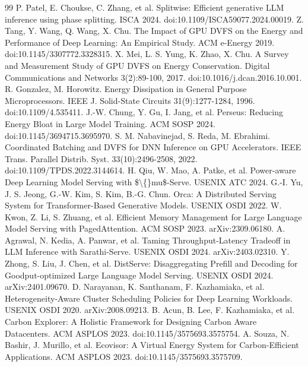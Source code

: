 \begin{thebibliography}{99}
\label{r16} P. Patel, E. Choukse, C. Zhang, et al. Splitwise: Efficient generative LLM inference using phase splitting. ISCA 2024. doi:10.1109/ISCA59077.2024.00019.
\label{r17} Z. Tang, Y. Wang, Q. Wang, X. Chu. The Impact of GPU DVFS on the Energy and Performance of Deep Learning:
An Empirical Study. ACM e-Energy 2019. doi:10.1145/3307772.3328315.
\label{r18} X. Mei, L. S. Yung, K. Zhao, X. Chu. A Survey and Measurement Study of GPU DVFS on Energy Conservation.
Digital Communications and Networks 3(2):89-100, 2017. doi:10.1016/j.dcan.2016.10.001.
\label{r19} R. Gonzalez, M. Horowitz. Energy Dissipation in General Purpose Microprocessors. IEEE J. Solid-State
Circuits 31(9):1277-1284, 1996. doi:10.1109/4.535411.
\label{r20} J.-W. Chung, Y. Gu, I. Jang, et al. Perseus: Reducing Energy Bloat in Large Model Training. ACM SOSP 2024.
doi:10.1145/3694715.3695970.
\label{r21} S. M. Nabavinejad, S. Reda, M. Ebrahimi. Coordinated Batching and DVFS for DNN Inference on GPU
Accelerators. IEEE Trans. Parallel Distrib. Syst. 33(10):2496-2508, 2022. doi:10.1109/TPDS.2022.3144614.
\label{r22} H. Qiu, W. Mao, A. Patke, et al. Power-aware Deep Learning Model Serving with \$\textbackslash\{\}mu\$-Serve. USENIX ATC 2024.
\label{r23} G.-I. Yu, J. S. Jeong, G.-W. Kim, S. Kim, B.-G. Chun. Orca: A Distributed Serving System for
Transformer-Based Generative Models. USENIX OSDI 2022.
\label{r24} W. Kwon, Z. Li, S. Zhuang, et al. Efficient Memory Management for Large Language Model Serving with
PagedAttention. ACM SOSP 2023. arXiv:2309.06180.
\label{r25} A. Agrawal, N. Kedia, A. Panwar, et al. Taming Throughput-Latency Tradeoff in LLM Inference with
Sarathi-Serve. USENIX OSDI 2024. arXiv:2403.02310.
\label{r26} Y. Zhong, S. Liu, J. Chen, et al. DistServe: Disaggregating Prefill and Decoding for Goodput-optimized
Large Language Model Serving. USENIX OSDI 2024. arXiv:2401.09670.
\label{r27} D. Narayanan, K. Santhanam, F. Kazhamiaka, et al. Heterogeneity-Aware Cluster Scheduling Policies for Deep
Learning Workloads. USENIX OSDI 2020. arXiv:2008.09213.
\label{r28} B. Acun, B. Lee, F. Kazhamiaka, et al. Carbon Explorer: A Holistic Framework for Designing Carbon Aware
Datacenters. ACM ASPLOS 2023. doi:10.1145/3575693.3575754.
\label{r29} A. Souza, N. Bashir, J. Murillo, et al. Ecovisor: A Virtual Energy System for Carbon-Efficient
Applications. ACM ASPLOS 2023. doi:10.1145/3575693.3575709.

\end{thebibliography}
